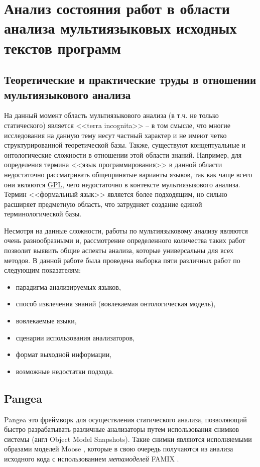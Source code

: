 \section{Анализ состояния работ в области анализа мультиязыковых исходных текстов программ}

\subsection{Теоретические и практические труды в отношении мультиязыкового анализа} \label{ssec:num2}

На данный момент область мультиязыкового анализа (в т.ч. не только статического) является
<<terra incognita>> -- в том смысле, что многие исследования на данную тему несут частный характер и не
имеют четко структурированной теоретической базы. Также, существуют концептуальные и онтологические сложности
в отношении этой области знаний. Например, для определения термина <<язык программирования>> в данной области
недостаточно рассматривать общепринятые варианты языков, так как чаще всего они являются \hyperlink{GPL}{GPL},
чего недостаточно в контексте мультиязыкового анализа. Термин <<формальный язык>> является более подходящим, но
сильно расширяет предметную область, что затрудняет создание единой терминологической базы.

Несмотря на данные сложности, работы по мультиязыковому анализу являются очень разнообразными и, рассмотрение
определенного количества таких работ позволит выявить общие аспекты анализа, которые универсальны для всех методов.
В данной работе была проведена выборка пяти различных работ по следующим показателям:
\begin{itemize}
    \item парадигма анализируемых языков,
    \item способ извлечения знаний (вовлекаемая онтологическая модель),
    \item вовлекаемые языки,
    \item сценарии использования анализаторов,
    \item формат выходной информации,
    \item возможные недостатки подхода.
\end{itemize}

\subsection{Pangea} \label{ssec:pangea}

Pangea \cite{pangea} это фреймворк для осуществления статического анализа, позволяющий
быстро разрабатывать различные анализаторы путем использования снимков системы (англ Object Model Snapshots).
Такие снимки являются исполняемыми образами моделей Moose \cite{moose}, которые в свою очередь получаются из
анализа исходного кода с использованием \textit{метамоделей} FAMIX \cite{famix}.

